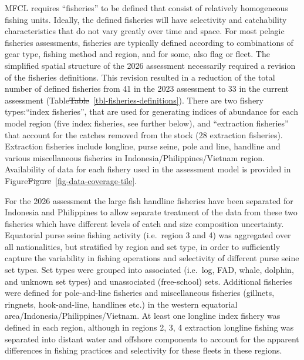 \documentclass[
  english,
  a4paper,
  a4paper,
  11pt]{SCreport}
\providecommand{\DIFdel}[1]{{\protect\color{red}\sout{#1}}}                      %
\providecommand{\DIFdelbegin}{} %
\providecommand{\DIFdelend}{} %
\newcommand{\DIFscaledelfig}{0.5}
\newlength{\DIFdelgraphicswidth} %
\newlength{\DIFdelgraphicsheight} %
\newcommand{\DIFdelincludegraphics}[2][]{%
\sbox{\DIFdelgraphicsbox}{\DIFOincludegraphics[#1]{#2}}%
\settoboxwidth{\DIFdelgraphicswidth}{\DIFdelgraphicsbox} %
\settoboxtotalheight{\DIFdelgraphicsheight}{\DIFdelgraphicsbox} %
\scalebox{\DIFscaledelfig}{%
\parbox[b]{\DIFdelgraphicswidth}{\usebox{\DIFdelgraphicsbox}\\[-\baselineskip] \rule{\DIFdelgraphicswidth}{0em}}\llap{\resizebox{\DIFdelgraphicswidth}{\DIFdelgraphicsheight}{%
\setlength{\unitlength}{\DIFdelgraphicswidth}%
\begin{picture}(1,1)%
\thicklines\linethickness{2pt} %
{\color[rgb]{1,0,0}\put(0,0){\framebox(1,1){}}}%
{\color[rgb]{1,0,0}\put(0,0){\line( 1,1){1}}}%
{\color[rgb]{1,0,0}\put(0,1){\line(1,-1){1}}}%
\end{picture}%
}\hspace*{3pt}}} %
} %
\DeclareRobustCommand{\DIFdelbegin}{\DIFOdelbegin \let\includegraphics\DIFdelincludegraphics} %
\DeclareRobustCommand{\DIFdelend}{\DIFOaddend \let\includegraphics\DIFOincludegraphics} %
\begin{document}
MFCL requires ``fisheries'' to be defined that consist of relatively
homogeneous fishing units. Ideally, the defined fisheries will have
selectivity and catchability characteristics that do not vary greatly
over time and space. For most pelagic fisheries assessments, fisheries
are typically defined according to combinations of gear type, fishing
method and region, and for some, also flag or fleet. The simplified
spatial structure of the 2026 assessment necessarily required a revision
of the fisheries definitions. This revision resulted in a reduction of
the total number of defined fisheries from 41 in the 2023 assessment to
33 in the current assessment (Table\DIFdelbegin \DIFdel{Table}\DIFdelend ~\ref{tbl-fisheries-definitions}).
There are two fishery types:``index fisheries'', that are used for
generating indices of abundance for each model region (five index
fisheries, see further below), and ``extraction fisheries'' that account
for the catches removed from the stock (28 extraction fisheries).
Extraction fisheries include longline, purse seine, pole and line,
handline and various miscellaneous fisheries in
Indonesia/Philippines/Vietnam region. Availability of data for each
fishery used in the assessment model is provided in
Figure\DIFdelbegin \DIFdel{Figure}\DIFdelend ~\ref{fig-data-coverage-tile}.

For the 2026 assessment the large fish handline fisheries have been
separated for Indonesia and Philippines to allow separate treatment of
the data from these two fisheries which have different levels of catch
and size composition uncertainty. Equatorial purse seine fishing
activity (i.e.~region 3 and 4) was aggregated over all nationalities,
but stratified by region and set type, in order to sufficiently capture
the variability in fishing operations and selectivity of different purse
seine set types. Set types were grouped into associated (i.e.~log, FAD,
whale, dolphin, and unknown set types) and unassociated (free-school)
sets. Additional fisheries were defined for pole-and-line fisheries and
miscellaneous fisheries (gillnets, ringnets, hook-and-line, handlines
etc.) in the western equatorial area/Indonesia/Philippines/Vietnam. At
least one longline index fishery was defined in each region, although in
regions 2, 3, 4 extraction longline fishing was separated into distant
water and offshore components to account for the apparent differences in
fishing practices and selectivity for these fleets in these regions.
\end{document}
